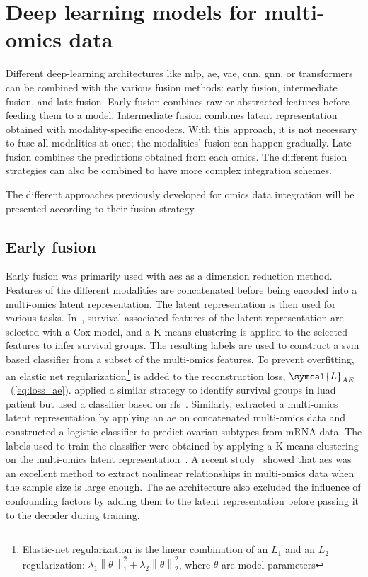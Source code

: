 \documentclass[../main.tex]{subfiles}
\begin{document}
\section[Deep learning and multi-omics data]{Deep learning models for multi-omics data}
	Different deep-learning architectures like \gls{mlp}, \gls{ae}, \gls{vae}, \gls{cnn}, \gls{gnn}, or transformers can be combined with the various fusion methods: early fusion, intermediate fusion, and late fusion.
	Early fusion combines raw or abstracted features before feeding them to a model.
	Intermediate fusion combines latent representation obtained with modality-specific encoders.
	With this approach, it is not necessary to fuse all modalities at once; the modalities' fusion can happen gradually.
	Late fusion combines the predictions obtained from each omics.
	The different fusion strategies can also be combined to have more complex integration schemes.

	The different approaches previously developed for omics data integration will be presented according to their fusion strategy.

	\subsection{Early fusion}
		Early fusion was primarily used with \glspl{ae} as a dimension reduction method.
		Features of the different modalities are concatenated before being encoded into a multi-omics latent representation.
		The latent representation is then used for various tasks.
		In~\cite{Chaudhary2018}, survival-associated features of the latent representation are selected with a Cox model, and a K-means clustering is applied to the selected features to infer survival groups.
		The resulting labels are used to construct a \gls{svm} based classifier from a subset of the multi-omics features.
		To prevent overfitting, an elastic net regularization\footnote{Elastic-net regularization is the linear combination of an \(L_{1}\) and an \(L_{2}\) regularization: \(\lambda_{1} \left\|\theta\right\|_{1}^{2} + \lambda_{2} \left\|\theta\right\|_{2}^{2}\), where \(\theta\) are model parameters} is added to the reconstruction loss, \(\symcal{L}_{AE}\)~(\cref{eq:loss_ae}).
		\citeauthor{Lee2020} applied a similar strategy to identify survival groups in \gls{luad} patient but used a classifier based on \glspl{rf}~\cite{Lee2020}.
		Similarly, \citeauthor{Guo2020} extracted a multi-omics latent representation by applying an \gls{ae} on concatenated multi-omics data and constructed a logistic classifier to predict ovarian subtypes from mRNA data.
		The labels used to train the classifier were obtained by applying a K-means clustering on the multi-omics latent representation~\cite{Guo2020}.
		A recent study~\cite{Yu2022} showed that \glspl{ae} was an excellent method to extract nonlinear relationships in multi-omics data when the sample size is large enough.
		The \gls{ae} architecture also excluded the influence of confounding factors by adding them to the latent representation before passing it to the decoder during training.
\end{document}
